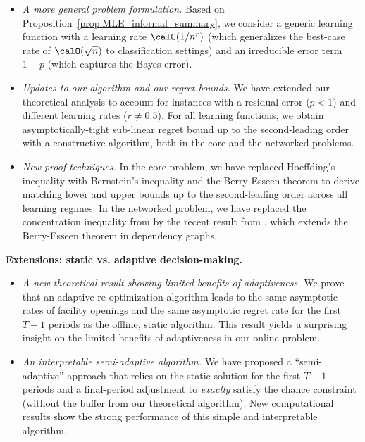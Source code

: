 \documentclass[11pt]{article}
\begin{document}
\begin{itemize}[topsep=-2pt,itemsep=-2pt]
\item[--] \emph{A more general problem formulation.} Based on Proposition~\ref{prop:MLE_informal_summary}, we consider a generic learning function with a learning rate $\calO(1/n^r)$ (which generalizes the best-case rate of $\calO(\sqrt n)$ to classification settings) and an irreducible error term $1-p$ (which captures the Bayes error).
\item[--] \emph{Updates to our algorithm and our regret bounds.} We have extended our theoretical analysis to account for instances with a residual error ($p<1$) and different learning rates ($r\neq0.5$). For all learning functions, we obtain asymptotically-tight sub-linear regret bound up to the second-leading order with a constructive algorithm, both in the core and the networked problems.
\item[--] \emph{New proof techniques.} In the core problem, we have replaced Hoeffding's inequality with Bernstein's inequality and the Berry-Esseen theorem to derive matching lower and upper bounds up to the second-leading order across all learning regimes. In the networked problem, we have replaced the concentration inequality from \cite{janson2004large} by the recent result from \cite{janisch2024berry}, which extends the Berry-Esseen theorem in dependency graphs.
\end{itemize}

\textbf{Extensions: static vs. adaptive decision-making.}

\begin{itemize}[topsep=-2pt,itemsep=-2pt]
\item[--] \emph{A new theoretical result showing limited benefits of adaptiveness.} We prove that an adaptive re-optimization algorithm leads to the same asymptotic rates of facility openings and the same asymptotic regret rate for the first $T-1$ periods as the offline, static algorithm. This result yields a surprising insight on the limited benefits of adaptiveness in our online problem.
\item[--] \emph{An interpretable semi-adaptive algorithm.} We have proposed a ``semi-adaptive'' approach that relies on the static solution for the first $T-1$ periods and a final-period adjustment to \textit{exactly} satisfy the chance constraint (without the buffer from our theoretical algorithm). New computational results show the strong performance of this simple and interpretable algorithm.
\end{itemize}
\end{document}
